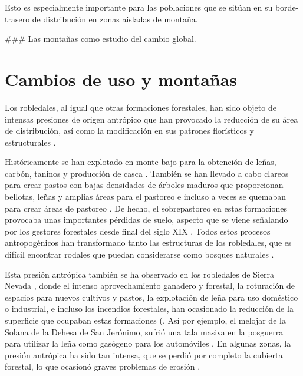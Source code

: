 Esto es especialmente importante para las poblaciones que se sitúan en su borde-trasero de distribución en zonas aisladas de montaña. 

### Las montañas como estudio del cambio global. 



\section{Cambios de uso y montañas}
Los robledales, al igual que otras formaciones forestales, han sido objeto de intensas presiones de origen antrópico que han provocado la reducción de su área de distribución, así como la modificación en sus patrones florísticos y estructurales \autocites{Gavilanetal2000EffectsDisturbance,Gavilanetal2007ModellingCurrent,Tarregaetal2006ForestStructure}. 

Históricamente se han explotado en monte bajo para la obtención de leñas, carbón, taninos y producción de casca \autocite{RuizdelaTorre2006FloraMayor}. También se han llevado a cabo clareos para crear pastos con bajas densidades de árboles maduros que proporcionan bellotas, leñas y amplias áreas para el pastoreo e incluso a veces se quemaban para crear áreas de pastoreo \autocite{ValbuenaCarabanaGil2017CentenaryCoppicing}. De hecho, el sobrepastoreo en estas formaciones provocaba unas importantes pérdidas de suelo, aspecto que se viene señalando por los gestores forestales desde final del siglo XIX \autocite{Laguna1872ComisionFlora}. Todos estos procesos antropogénicos han transformado tanto las estructuras de los robledales, que es difícil encontrar rodales que puedan considerarse como bosques naturales \autocite{RuizdelaTorre2006FloraMayor}. 

Esta presión antrópica también se ha observado en los robledales de Sierra Nevada \autocite{JimenezOlivencia1991PaisajesSierra}, donde el intenso aprovechamiento ganadero y forestal, la roturación de espacios para nuevos cultivos y pastos, la explotación de leña para uso doméstico o industrial, e incluso los incendios forestales, han ocasionado la reducción de la superficie que ocupaban estas formaciones \autocite{CamachoOlmedoetal2002AltaAlpujarra} (. Así por ejemplo, el melojar de la Solana de la Dehesa de San Jerónimo, sufrió una tala masiva en la posguerra para utilizar la leña como gasógeno para los automóviles \autocite{Prieto1975BosquesSierra}. En algunas zonas, la presión antrópica ha sido tan intensa, que se perdió por completo la cubierta forestal, lo que ocasionó graves problemas de erosión \autocite{MesaGarrido2019ReforestacionSilvicultura,RomeroZurbano1909DivisionHidrologicoforestal}. 

